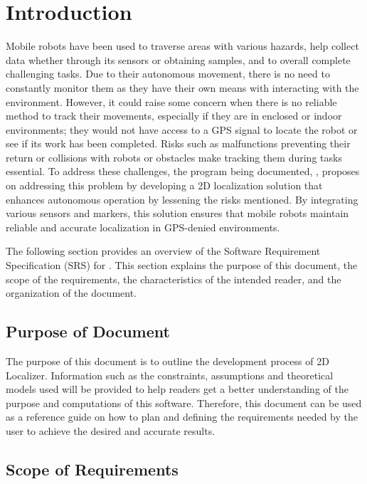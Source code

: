 \documentclass[12pt]{article}
\begin{document}
\newpage


\section{Introduction}

Mobile robots have been used to traverse areas with various hazards, help collect data whether through its sensors or obtaining samples, and to overall complete challenging tasks. Due to their autonomous movement, there is no need to constantly monitor them as they have their own means with interacting with the environment. However, it could raise some concern when there is no reliable method to track their movements, especially if they are in enclosed or indoor environments; they would not have access to a GPS signal to locate the robot or see if its work has been completed. Risks such as malfunctions preventing their return or collisions with robots or obstacles make tracking them during tasks essential. To address these challenges, the program being documented, \progname,  proposes on addressing this problem by developing a 2D localization solution that enhances autonomous operation by lessening the risks mentioned. By integrating various sensors and markers, this solution ensures that mobile robots maintain reliable and accurate localization in GPS-denied environments.

The following section provides an overview of the Software Requirement Specification (SRS) for \progname. This section explains the purpose of this document, the scope of the requirements, the characteristics of the intended reader, and the organization of the document.

\subsection{Purpose of Document}

The purpose of this document is to outline the development process of 2D Localizer. Information such as the constraints, assumptions and theoretical models used will be provided to help readers get a better understanding of the purpose and computations of this software. Therefore, this document can be used as a reference guide on how to plan and defining the requirements needed by the user to achieve the desired and accurate results.

\subsection{Scope of Requirements} 
\end{document}
